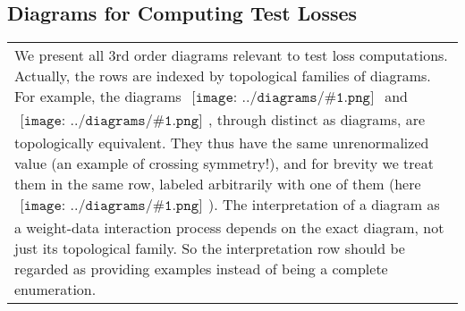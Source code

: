 \documentclass{article}
\theoremstyle{plain}
\theoremstyle{definition}
\newcommand{\sdia}[1]{\begin{gathered}\texttt{[image: ../diagrams/\#1.png]}\end{gathered}}
\begin{document}
    \subsection{
        Diagrams for Computing Test Losses
    }

    \begin{tabular}{p{}}
        We present all $3$rd order diagrams relevant to test loss computations.
        Actually, the rows are indexed by topological families of diagrams.  For
        example, the diagrams $\sdia{(0-1-2)(01-12)}$ and
        $\sdia{(0-1-2)(02-12)}$, through distinct as diagrams, are
        topologically equivalent.  They thus have the same unrenormalized value
        (an example of crossing symmetry!), and for brevity we treat them
        in the same row, labeled arbitrarily with one of them (here
        $\sdia{(0-1-2)(02-12)}$).  The interpretation of a diagram as a
        weight-data interaction process depends on the exact diagram, not just
        its topological family.  So the interpretation row should be regarded
        as providing examples instead of being a complete enumeration.
    \end{tabular}    
\end{document}

